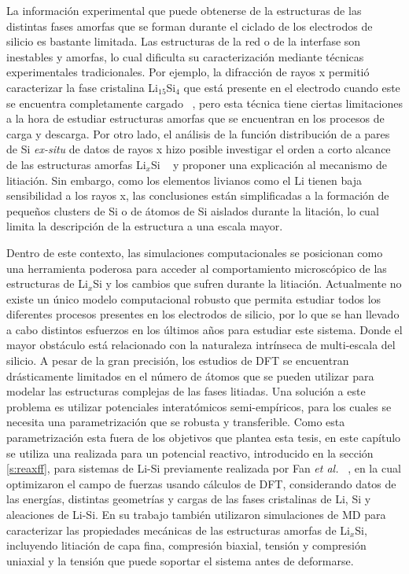 La información experimental que puede obtenerse de la estructuras de las 
distintas fases amorfas que se forman durante el ciclado de los electrodos de 
silicio es bastante limitada. Las estructuras de la red o de la interfase son 
inestables y amorfas, lo cual dificulta su caracterización mediante técnicas
experimentales tradicionales. Por ejemplo, la difracción de rayos x permitió
caracterizar la fase cristalina Li$_{15}$Si$_4$ que está presente en el electrodo
cuando este se encuentra completamente cargado ~\cite{obrovac2004}, pero esta 
técnica tiene ciertas limitaciones a la hora de estudiar estructuras amorfas 
que se encuentran en los procesos de carga y descarga. Por otro lado, el análisis
de la función distribución de a pares de Si \textit{ex-situ} de datos de rayos x
hizo posible investigar el orden a corto alcance de las estructuras amorfas
Li$_x$Si ~\cite{key2011} y proponer una explicación al mecanismo de litiación.
Sin embargo, como los elementos livianos como el Li tienen baja sensibilidad a 
los rayos x, las conclusiones están simplificadas a la formación de pequeños 
clusters de Si o de átomos de Si aislados durante la litación, lo cual limita la 
descripción de la estructura a una escala mayor.

Dentro de este contexto, las simulaciones computacionales se posicionan como una
herramienta poderosa para acceder al comportamiento microscópico de las 
estructuras de Li$_x$Si y los cambios que sufren durante la litiación. Actualmente
no existe un único modelo computacional robusto que permita estudiar todos los
diferentes procesos presentes en los electrodos de silicio, por lo que se han 
llevado a cabo distintos esfuerzos en los últimos años para estudiar este sistema.
Donde el mayor obstáculo está relacionado con la naturaleza intrínseca de 
multi-escala del silicio. A pesar de la gran precisión, los estudios de DFT se
encuentran drásticamente limitados en el número de átomos que se pueden utilizar
para modelar las estructuras complejas de las fases litiadas. Una solución a este
problema es utilizar potenciales interatómicos semi-empíricos, para los cuales 
se necesita una parametrización que se robusta y transferible. Como esta 
parametrización esta fuera de los objetivos que plantea esta tesis, en este 
capítulo se utiliza una realizada para un potencial reactivo, introducido en 
la sección \ref{s:reaxff}, para sistemas de Li-Si previamente realizada por Fan 
\textit{et al.} ~\cite{fan2013}, en la cual optimizaron el campo de fuerzas usando 
cálculos de DFT, considerando datos de las energías, distintas geometrías y cargas
de las fases cristalinas de Li, Si y aleaciones de Li-Si. En su trabajo también
utilizaron simulaciones de MD para caracterizar las propiedades mecánicas de
las estructuras amorfas de Li$_x$Si, incluyendo litiación de capa fina, compresión
biaxial, tensión y compresión uniaxial y la tensión que puede soportar el sistema 
antes de deformarse.

